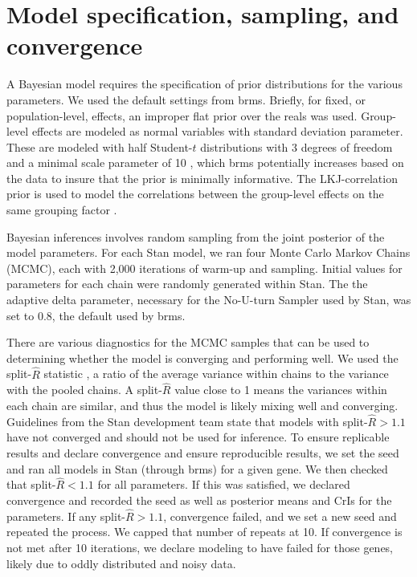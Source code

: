 \documentclass[12pt]{extarticle}
\begin{document}
\section*{Model specification, sampling, and convergence}

A Bayesian model requires the specification of prior distributions for the various parameters. We used the default settings from brms. Briefly, for fixed, or population-level, effects, an improper flat prior over the reals was used. Group-level effects are modeled as normal variables with standard deviation parameter. These are modeled with half Student-$t$ distributions with 3 degrees of freedom and a minimal scale parameter of 10 \cite{Gelman2006}, which brms potentially increases based on the data to insure that the prior is minimally informative. The LKJ-correlation prior is used to model the correlations between the group-level effects on the same grouping factor \cite{Lewandowski2009}.

Bayesian inferences involves random sampling from the joint posterior of the model parameters. For each Stan model, we ran four Monte Carlo Markov Chains (MCMC), each with 2,000 iterations of warm-up and sampling. Initial values for parameters for each chain were randomly generated within Stan. The the adaptive delta parameter, necessary for the No-U-turn Sampler \cite{Hoffman2014} used by Stan, was set to 0.8, the default used by brms.

There are various diagnostics for the MCMC samples that can be used to determining whether the model is converging and performing well. We used the split-$\widehat{R}$ statistic \cite{Gelman2013}, a ratio of the average variance within chains to the variance with the pooled chains. A split-$\widehat{R}$ value close to 1 means the variances within each chain are similar, and thus the model is likely mixing well and converging. Guidelines from the Stan development team state that models with split-$\widehat{R} > 1.1$ have not converged and should not be used for inference. To ensure replicable results and declare convergence and ensure reproducible results, we set the seed and ran all models in Stan (through brms) for a given gene. We then checked that split-$\widehat{R} < 1.1$ for all parameters. If this was satisfied, we declared convergence and recorded the seed as well as posterior means and CrIs for the parameters. If any split-$\widehat{R} > 1.1$, convergence failed, and we set a new seed and repeated the process. We capped that number of repeats at 10. If convergence is not met after 10 iterations, we declare modeling to have failed for those genes, likely due to oddly distributed and noisy data.



\end{document}
